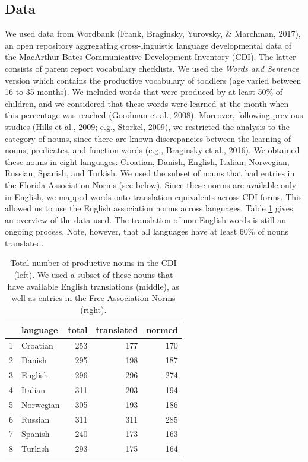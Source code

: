 \documentclass[10pt, letterpaper]{article}
\begin{document}
\subsection{Data}\label{data}

We used data from Wordbank (Frank, Braginsky, Yurovsky, \& Marchman,
2017), an open repository aggregating cross-linguistic language
developmental data of the MacArthur-Bates Communicative Development
Inventory (CDI). The latter consists of parent report vocabulary
checklists. We used the \emph{Words and Sentence} version which contains
the productive vocabulary of toddlers (age varied between 16 to 35
months). We included words that were produced by at least 50\% of
children, and we considered that these words were learned at the month
when this percentage was reached (Goodman et al., 2008). Moreover,
following previous studies (Hills et al., 2009; e.g., Storkel, 2009), we
restricted the analysis to the category of nouns, since there are known
discrepancies between the learning of nouns, predicates, and function
words (e.g., Braginsky et al., 2016). We obtained these nouns in eight
languages: Croatian, Danish, English, Italian, Norwegian, Russian,
Spanish, and Turkish. We used the subset of nouns that had entries in
the Florida Association Norms (see below). Since these norms are
available only in English, we mapped words onto translation equivalents
across CDI forms. This allowed us to use the English association norms
across languages. Table \ref{tab:stats} gives an overview of the data
used. The translation of non-English words is still an ongoing process.
Note, however, that all languages have at least 60\% of nouns
translated.

\begin{table}[H]
\centering
\begin{tabular}{rlrrr}
  \hline
 & language & total & translated & normed \\ 
  \hline
1 & Croatian & 253 & 177 & 170 \\ 
  2 & Danish & 295 & 198 & 187 \\ 
  3 & English & 296 & 296 & 274 \\ 
  4 & Italian & 311 & 203 & 194 \\ 
  5 & Norwegian & 305 & 193 & 186 \\ 
  6 & Russian & 311 & 311 & 285 \\ 
  7 & Spanish & 240 & 173 & 163 \\ 
  8 & Turkish & 293 & 175 & 164 \\ 
   \hline
\end{tabular}
\caption{\label{tab:stats}Total number of productive nouns in the CDI (left). We used a subset of these nouns that have available English translations (middle), as well as entries in the Free Association Norms (right).} 
\end{table}
\end{document}
